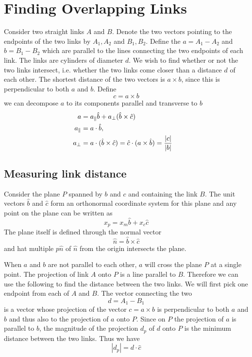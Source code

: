 \documentclass[nofootinbib,preprint,floatfix,titlepage,endfloats,superscriptaddress]{revtex4} %
\begin{document}



\section{Finding Overlapping Links}
Consider two straight links $A$ and $B$. Denote the two vectors pointing to the endpoints of the two links by $A_1,A_2$ and $B_1,B_2$. Define the $a= A_1 - A_2$ and $ b= B_1 -B_2$ which are parallel to the lines connecting the two endpoints of each link. The links are cylinders of diameter $d$. We wish to find whether or not the two links intersect, i.e. whether the two links come closer than a distance $d$ of each other. The shortest distance of the two vectors is $a \times b$, since this is perpendicular to both $a$ and $b$. Define
\[c = a\times b\]
we can decompose $ a$ to its components parallel and transverse to $b$ 
\begin{align}
a &= a_\parallel \hat{b}+ a_\perp (\hat{b}\times \hat{c})\cr
a_\parallel &= a\cdot \hat{b}, \cr
a_\perp &= a \cdot (\hat{b}\times \hat{c}) = \hat{c} \cdot (a\times \hat{b})= {|c|\over |b|}
\end{align}

\subsection{Measuring link distance}
Consider the plane $P$ spanned by $b$ and $c$ and containing the link $B$. The unit vectors $\hat{b}$ and $\hat{c}$ form an orthonormal coordinate system for this plane and any point on the plane can be written as
\[x_p = x_m \hat{b}+ x_c\hat{c}\]
The plane itself is defined through the normal vector 
\[\hat{n}= \hat{b}\times\hat{c}\]
and hat multiple $p\hat{n}$ of $\hat{n}$ from the origin intersects the plane.

When $ a$ and $b$ are not parallel to each other, $a$ will cross the plane $P$ at a single point. The projection of link $A$ onto $P$ is a line parallel to $B$. Therefore we can use the following to find the distance between the two links. We will first pick one endpoint from each of $A$ and $B$. The vector connecting the two
\[d = A_1-B_1\]
is a vector whose projection of the vector $c = a\times b$ is perpendicular to both $a$ and $b$ and thus also to the projection of $a$ onto $P$. Since on $P$ the projection of $a$ is parallel to $b$, the magnitude of the projection $d_p$ of $d$ onto $P$ is the minimum distance between the two links. Thus we have
\[|d_p| = d \cdot \hat{c}\]
\end{document}
